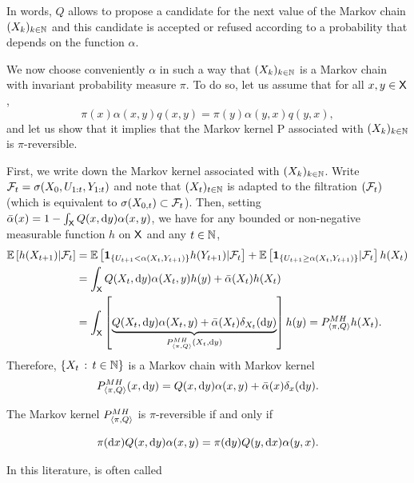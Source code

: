 \documentclass[english,graybox,envcountchap,envcountsame,sectrefs,shortlabels]{svmono}
\theoremstyle{style}
\newcommand{\bs}{\begin{shaded}}
\newcommand{\es}{\end{shaded}}
\begin{document}
 In words, $Q$ allows to propose a candidate for the next value of
the Markov chain $(X_{k})_{k\in\mathbb{N}}$ and this candidate is accepted or
refused according to a probability that depends on the function $\alpha$.

We now choose conveniently $\alpha$ in such a way that $(X_{k})_{k\in\mathbb{N}}$
is a Markov chain with invariant probability measure $\pi$. To do so, let us assume that
for all $x,y\in\mathsf{X}$,
\begin{equation}
\pi(x)\alpha(x,y)q(x,y)=\pi(y)\alpha(y,x)q(y,x),\label{eq:balance}
\end{equation}
and let us show that it implies that the Markov kernel P associated
with $(X_{k})_{k\in\mathbb{N}}$ is $\pi$-reversible.

First, we write down the Markov kernel associated with $(X_{k})_{k\in\mathbb{N}}$. Write $\mathcal{F}_{t}=\sigma(X_{0},U_{1:t},Y_{1:t})$
and note that $(X_{t})_{t\in\mathbb{N}}$ is adapted to the filtration $(\mathcal{F}_{t})$
(which is equivalent to $\sigma(X_{0,t})\subset\mathcal{F}_{t}$). Then,
setting $\bar{\alpha}(x)=1-\int_{\mathsf{X}}Q(x,\mathrm{d} y)\alpha(x,y)$, we
have for any bounded or non-negative measurable function $h$ on $\mathsf{X}$
and any $t\in\mathbb{N}$,
\begin{align*}
\mathbb{E}\left[h(X_{t+1})|\mathcal{F}_{t}\right] & =\mathbb{E}\left[\mathbf{1}_{\left\{ U_{t+1}<\alpha(X_{t},Y_{t+1})\right\} }h(Y_{t+1})|\mathcal{F}_{t}\right]+\mathbb{E}\left[\mathbf{1}_{\left\{ U_{t+1}\geq\alpha(X_{t},Y_{t+1})\right\} }|\mathcal{F}_{t}\right]h(X_{t})\\
 & =\int_{\mathsf{X}}Q(X_{t},\mathrm{d} y)\alpha(X_{t},y)h(y)+\bar{\alpha}(X_{t})h(X_{t})\\
 & =\int_{\mathsf{X}}\left[\underbrace{Q(X_{t},\mathrm{d} y)\alpha(X_{t},y)+\bar{\alpha}(X_{t})\delta_{X_{t}}(\mathrm{d} y)}_{P_{\langle\pi,Q\rangle}^{MH}(X_{t},\mathrm{d} y)}\right]h(y)=P_{\langle\pi,Q\rangle}^{MH}h(X_{t}).
\end{align*}
Therefore, $\left\{ X_{t}\,:\,t\in\mathbb{N}\right\}$ is a Markov chain with Markov
kernel
\begin{equation}
P_{\langle\pi,Q\rangle}^{MH}(x,\mathrm{d} y)=Q(x,\mathrm{d} y)\alpha(x,y)+\bar{\alpha}(x)\delta_{x}(\mathrm{d} y).\label{eq:def:mh}
\end{equation}
 \bs
\begin{lemma}
\label{lem:reversible} The Markov kernel $P_{\langle\pi,Q\rangle}^{MH}$ is $\pi$-reversible
if and only if

\begin{equation}
\pi(\mathrm{d} x)Q(x,\mathrm{d} y)\alpha(x,y)=\pi(\mathrm{d} y)Q(y,\mathrm{d} x)\alpha(y,x).\label{eq:balance:detaillee}
\end{equation}
\end{lemma}
\es In this literature,  is often called
\end{document}
